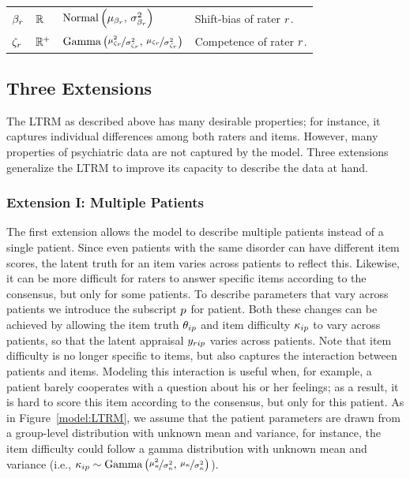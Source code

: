 \documentclass[a4paper,usenames,dvipsnames]{article}
\newenvironment{revision}{\color{teal}}{\color{black}}
\begin{document}
\begin{revision}
\begin{table}[!ht]
\begin{tabular}{llll}
	$\beta_r      		$&$	\mathbb{R}			$&$\text{Normal}\left(\mu_{\beta_r},\,\sigma_{\beta_r}^2\right) $&
	Shift-bias of rater $r$.\\

	$\zeta_r 		$&$	\mathbb{R}^+	$&$\text{Gamma}\left(\nicefrac{\mu_{\zeta_r}^2}{\sigma_{\zeta_r}^2},\,\nicefrac{\mu_{\zeta_r}}{\sigma_{\zeta_r}^2}\right) $&
	Competence of rater $r$.\\

	\bottomrule

	\end{tabular}

\end{table}

\end{revision}


\subsection*{Three Extensions}

The LTRM as described above has many desirable properties; for instance, it captures individual differences among both raters and items. However, many properties of psychiatric data are not captured by the model. Three extensions generalize the LTRM to improve its capacity to describe the data at hand.

\subsubsection*{Extension I: Multiple Patients}
The first extension allows the model to describe multiple patients instead of a single patient. Since even patients with the same disorder can have different item scores, the latent truth for an item varies across patients to reflect this. \begin{revision}Likewise, it can be\end{revision} more difficult for raters to answer specific items according to the consensus, but only for some patients. To describe parameters that vary across patients we introduce the subscript $p$ for patient. Both these changes can be achieved by allowing the item truth $\theta_{ip}$ and item difficulty $\kappa_{ip}$ to vary across patients, so that the latent appraisal $y_{rip}$ varies across patients. Note that item difficulty is no longer specific to items, but also captures the interaction between patients and items. Modeling this interaction is useful when, for example, a patient barely cooperates with a question about his or her feelings; as a result, it is hard to score this item according to the consensus, but only for this patient. As in Figure~\ref{model:LTRM}, we assume that the patient parameters are drawn from a group-level distribution with unknown mean and variance, for instance, the item difficulty could follow a gamma distribution with unknown mean and variance (i.e., $\kappa_{ip} \sim \text{Gamma}\left(\nicefrac{\mu_\kappa^2}{\sigma_\kappa^2},\,\nicefrac{\mu_\kappa}{\sigma_\kappa^2}\right)$).
\end{document}
